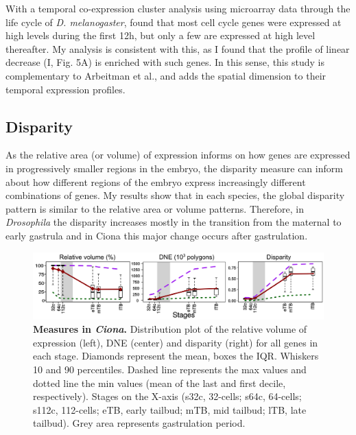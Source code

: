 With a temporal co-expression cluster analysis using microarray data through the life cycle of \textit{D. melanogaster}, \citet{Arbeitman2002} found that most cell cycle genes were expressed at high levels during the first 12h, but only a few are expressed at high level thereafter.
My analysis is consistent with this, as I found that the profile of linear decrease (I, Fig. 5A) is enriched with such genes. In this sense, this study is complementary to Arbeitman et al., and adds the spatial dimension to their temporal expression profiles.


\subsection{Disparity}
As the relative area (or volume) of expression informs on how genes are expressed in progressively smaller regions in the embryo, the disparity measure can inform about how different regions of the embryo express increasingly different combinations of genes.
%
My results show that in each species, the global disparity pattern is similar to the relative area or volume patterns.
Therefore, in \textit{Drosophila} the disparity increases mostly in the transition from the maternal to early gastrula and in Ciona this major change occurs after gastrulation.

\begin{figure}[b]
  \includegraphics[width=\textwidth]{./Images/Art-II/3_measures_nostars.png}
  \centering
  \caption{\textbf{Measures in \textit{Ciona}.} Distribution plot of the relative volume of expression (left), DNE (center) and disparity (right) for all genes in each stage. Diamonds represent the mean, boxes the IQR. Whiskers 10 and 90 percentiles. Dashed line represents the max values and dotted line the min values (mean of the last and first decile, respectively). Stages on the X-axis (s32c, 32-cells; s64c, 64-cells; s112c, 112-cells; eTB, early tailbud; mTB, mid tailbud; lTB, late tailbud). Grey area represents gastrulation period.}
  \label{fig:Art-II-3measures}
\end{figure}

